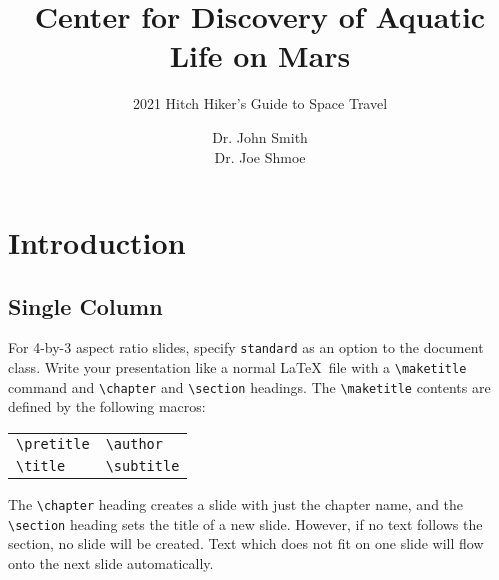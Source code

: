 \documentclass{antclass}
\title{Center for Discovery of Aquatic Life on Mars}
\subtitle{2021 Hitch Hiker's Guide to Space Travel}
\author{Dr. John Smith\\ Dr. Joe Shmoe}
\begin{document}
\maketitle

\chapter{Introduction}

\section{Single Column}

For 4-by-3 aspect ratio slides, specify \verb|standard| as an option to the
document class. Write your presentation like a normal \LaTeX\ file with a
\verb|\maketitle| command and \verb|\chapter| and \verb|\section| headings. The
\verb|\maketitle| contents are defined by the following macros:
\begin{center}
    \begin{tabular}{l@{\qquad}l}
        \verb|\pretitle| &
        \verb|\author| \\
        \verb|\title| &
        \verb|\subtitle|
    \end{tabular}
\end{center}
The \verb|\chapter| heading creates a slide with just the chapter name, and the
\verb|\section| heading sets the title of a new slide. However, if no text
follows the section, no slide will be created. Text which does not fit on one
slide will flow onto the next slide automatically.
\end{document}
